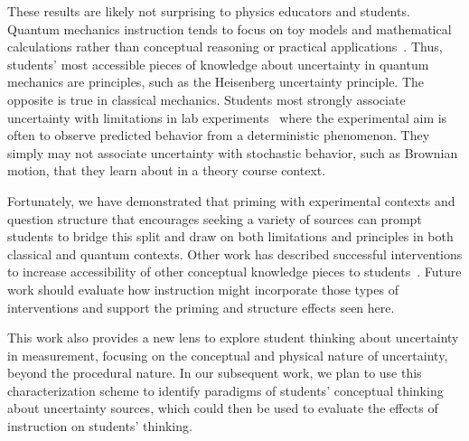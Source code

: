 \documentclass[english,aps,prstper,reprint,showpacs,longbibliography,superscriptaddress,nofootinbib]{revtex4-2}
\begin{document}
These results are likely not surprising to physics educators and students. Quantum mechanics instruction tends to focus on toy models and mathematical calculations rather than conceptual reasoning or practical applications~\cite{Johansson2018}. Thus, students' most accessible pieces of knowledge about uncertainty in quantum mechanics are principles, such as the Heisenberg uncertainty principle. %
The opposite is true in classical mechanics. Students most strongly associate uncertainty with limitations in lab experiments~\cite{Sere1993,Holmes2015} where the experimental aim is often to observe predicted behavior from a deterministic phenomenon. They simply may not associate uncertainty with stochastic behavior, such as Brownian motion, that they learn about in a theory course context.

Fortunately, we have demonstrated that priming with experimental contexts and question structure that encourages seeking a variety of sources can prompt students to bridge this split and draw on both limitations and principles in both classical and quantum contexts. %
Other work has described successful interventions to increase accessibility of other conceptual knowledge pieces to students~\cite[e.g.,][]{Gette2018}. Future work should evaluate how instruction might incorporate those types of interventions and support the priming and structure effects seen here. %

This work also provides a new lens to explore student thinking about uncertainty in measurement, focusing on the conceptual and physical nature of uncertainty, beyond the procedural nature. In our subsequent work, we plan to use this characterization scheme to identify paradigms of students' conceptual thinking about uncertainty sources, which could then be used to evaluate the effects of instruction on students' thinking.

\end{document}
